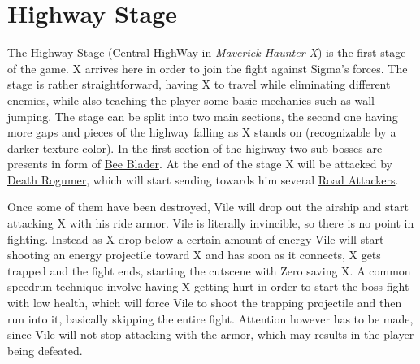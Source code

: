 \section{Highway Stage}
The Highway Stage (Central HighWay in \textit{Maverick Haunter X}) is the first stage of the game. X arrives here in order to join the fight against Sigma's forces.
 The stage is rather straightforward, having X to travel while eliminating different enemies, while also teaching the player some basic mechanics such as wall-jumping.  The stage can be split into two main sections\cite{stratwiki:HighWay}, the second one having more gaps and pieces of the highway falling as X stands on (recognizable by a darker texture color). In the first section of the highway two sub-bosses are presents in form of \hyperlink{miniboss:Bee_Blader}{Bee Blader}. At the end of the stage X will be attacked by \hyperlink{veichle:Death_Rogumer}{Death Rogumer}, which will start sending towards him several \hyperlink{enem:Road_Attackers}{Road Attackers}.

 
 Once some of them have been destroyed, Vile will drop out the airship and start attacking X with his ride armor. Vile is literally invincible, so there is 
 no point in fighting. Instead as X drop below a certain amount of energy Vile will start shooting an energy projectile toward X and has soon as it connects, X gets trapped and the fight ends, starting the cutscene with Zero saving X. A common speedrun  technique involve having X getting hurt in order to start the boss fight with low health, which will force Vile to shoot the trapping projectile and then run into it, basically skipping the entire fight.  Attention however has to be made, since Vile will not stop attacking with the armor, which may results in the player being defeated.
 
